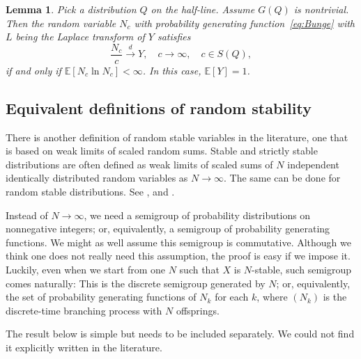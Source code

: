 \documentclass[12pt]{amsart}
\newtheorem{lemma}{Lemma}[section]
\theoremstyle{remark}
\theoremstyle{definition}
\begin{document}
\begin{lemma}
\label{lemma:semigroup-scaling}
Pick a distribution $Q$ on the half-line. Assume $G(Q)$ is nontrivial. Then the random variable $N_c$ with probability generating function~\eqref{eq:Bunge} with $L$ being the Laplace transform of $Y$ satisfies 
\begin{equation}
\label{eq:param-c}
\frac{N_c}{c} \stackrel{d}{\to} Y,\quad c \to \infty,\quad c \in S(Q), 
\end{equation}
if and only if $\mathbb E[N_c\ln N_c] < \infty$. In this case, $\mathbb E[Y] = 1$.
\end{lemma}

\subsection{Equivalent definitions of random stability} 
There is another definition of random stable variables in the literature, one that is based on weak limits of scaled random sums. Stable and strictly stable distributions  are often defined as weak limits of scaled sums of $N$ independent identically distributed random variables as $N \to \infty$. The same can be done for random stable distributions. See \cite[Section 2]{Anna}, and \cite[Theorems 1, 2, 3]{B}.

Instead of $N \to \infty$, we need a semigroup of probability distributions on nonnegative integers; or, equivalently, a semigroup of probability generating functions. We might as well assume this semigroup is commutative. Although we think one does not really need this assumption, the proof is easy if we impose it. Luckily, even when we start from one $N$ such that $X$ is $N$-stable, such semigroup comes naturally: This is the discrete semigroup generated by $N$; or, equivalently, the set of probability generating functions of $N_k$ for each $k$, where $(N_k)$ is the discrete-time branching process with $N$ offsprings. 

The result below is simple but needs to be included separately. We could not find it explicitly written in the literature. 
\end{document}
